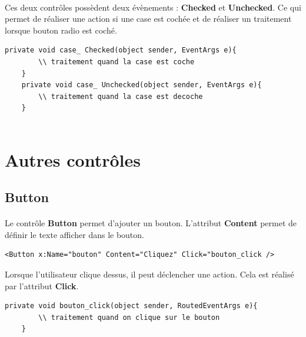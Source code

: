 \documentclass[twoside,UTF8]{EPURapport}
\begin{document}
\paragraph{}
Ces deux contrôles possèdent deux évènements : \textbf{Checked} et \textbf{Unchecked}. Ce qui permet de réaliser une action si une case est cochée et de réaliser un traitement lorsque bouton radio est coché.
 
\begin{lstlisting}[caption={Gestionnaire d'événements du contrôle \textbf{CheckBox}}]
	private void case_ Checked(object sender, EventArgs e){
		\\ traitement quand la case est coche
	}
	private void case_ Unchecked(object sender, EventArgs e){
		\\ traitement quand la case est decoche
	}
	
\end{lstlisting}
		
	\section{Autres contrôles}
		\subsection{Button}
		
\paragraph{}
Le contrôle \textbf{Button} permet d'ajouter un bouton. L'attribut \textbf{Content} permet de définir le texte afficher dans le bouton.

\begin{lstlisting}[caption={Gestionnaire d'événements du contrôle \textbf{CheckBox}}]
	<Button x:Name="bouton" Content="Cliquez" Click="bouton_click />	
\end{lstlisting}

Lorsque l'utilisateur clique dessus, il peut déclencher une action. Cela est réalisé par l'attribut \textbf{Click}.

\begin{lstlisting}[caption={Gestionnaire d'événements du contrôle \textbf{Button}}]
	private void bouton_click(object sender, RoutedEventArgs e){
		\\ traitement quand on clique sur le bouton
	}
	
\end{lstlisting}
\end{document}
